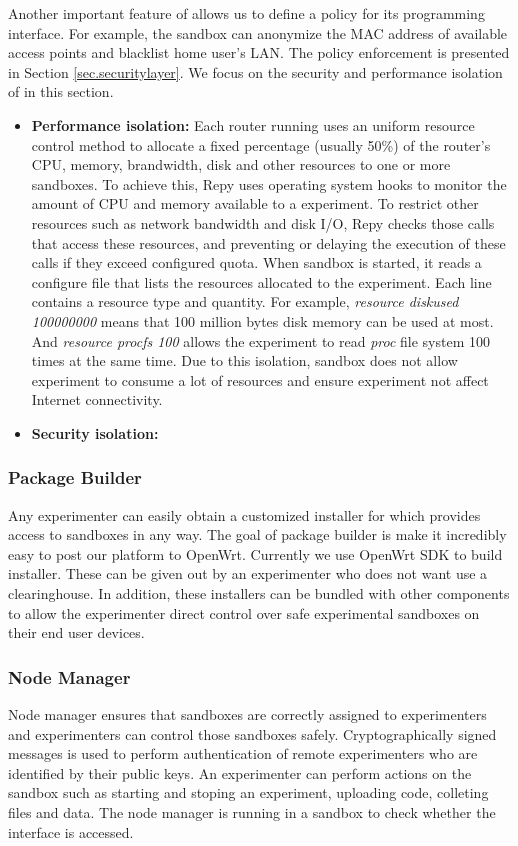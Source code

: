 Another important feature of \sandboxname allows us to define a policy for its programming interface. For example, the sandbox can anonymize the MAC address of available access points and blacklist home user's LAN. The policy enforcement is presented in Section \ref{sec.securitylayer}. We focus on the security and performance isolation of \sandboxname in this section.
\begin{itemize}
\item \textbf{Performance isolation: }Each router running \sysname uses an uniform resource control method to allocate a fixed percentage (usually 50\%) of the router's CPU, memory, brandwidth, disk and other resources to one or more sandboxes. To achieve this, Repy uses operating system hooks to monitor the amount of CPU and memory available to a experiment. To restrict other resources such as network bandwidth and disk I/O, Repy checks those calls that access these resources, and preventing or delaying the execution of these calls if they exceed configured quota. When sandbox is started, it reads a configure file that lists the resources allocated to the experiment. Each line contains a resource type and quantity. For example, \textit{resource diskused 100000000} means that 100 million bytes disk memory can be used at most. And \textit{resource procfs 100} allows the experiment to read \textit{proc} file system 100 times at the same time. Due to this isolation, sandbox does not allow experiment to consume a lot of resources and ensure experiment not affect Internet connectivity.

\item \textbf{Security isolation: }

 \end{itemize}
\subsubsection{Package Builder}
\label{sec.packagebuilder}
Any experimenter can easily obtain a customized installer for \sysname which provides access to sandboxes in any way. The goal of package builder is make it incredibly easy to post our platform to OpenWrt. Currently we use OpenWrt SDK to build installer. These can be given out by an experimenter who does not want use a clearinghouse. In addition, these installers can be bundled with other components to allow the experimenter direct control over safe experimental sandboxes on their end user devices.

\subsubsection{Node Manager}
\label{sec.nodemanager}
Node manager\cite{nodemanager} ensures that sandboxes are correctly assigned to experimenters and experimenters can control those sandboxes safely. Cryptographically signed messages is used to perform authentication of remote experimenters who are identified by their public keys. An experimenter can perform actions on the sandbox such as starting and stoping an experiment, uploading code, colleting files and data. The node manager is running in a sandbox to check whether the interface is accessed.


